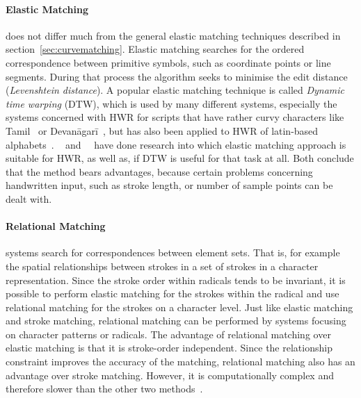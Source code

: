 \paragraph{Elastic Matching} does not differ much from the general elastic matching 
techniques described in section~\ref{sec:curvematching}. Elastic matching 
searches for the ordered correspondence between primitive symbols, such as 
coordinate points or line segments. During that process the algorithm seeks to
minimise the edit distance (\emph{Levenshtein distance}). A popular elastic 
matching technique is called \emph{Dynamic time warping} (DTW), which is used by
many different systems, especially the systems concerned with HWR for scripts that
have rather curvy characters like Tamil~ or 
Devanāgarī~, but has also been applied to HWR of
latin-based alphabets~.
~\citeyear{Niels2004} and~~\citeyear{Joshi2004a} have done research into which 
elastic matching approach is suitable for HWR, as well as, if DTW is useful for 
that task at all. Both conclude that the method bears advantages, because 
certain problems concerning handwritten input, such as stroke length, or number 
of sample points can be dealt with.

\paragraph{Relational Matching} systems search for correspondences between element sets. 
That is, for example the spatial relationships between strokes in a set of 
strokes in a character representation. Since the stroke order within radicals
tends to be invariant, it is possible to perform elastic matching for the strokes
within the radical and use relational matching for the strokes on a character 
level. Just like elastic matching and stroke matching, relational matching can
be performed by systems focusing on character patterns or radicals.
The advantage of relational matching over elastic matching is that it is 
stroke-order independent. Since the relationship constraint improves the accuracy
of the matching, relational matching also has an advantage over stroke matching.
However, it is computationally complex and therefore slower than the other 
two methods~.

